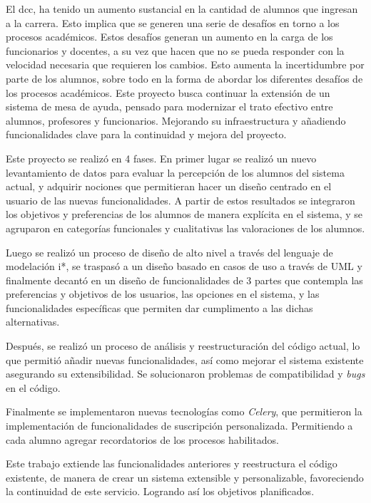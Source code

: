 \begin{resumen}
   \par El \acrfull{dcc}, ha tenido un aumento sustancial en la cantidad de alumnos que ingresan a la carrera. Esto implica que se generen una serie de desafíos en torno a los procesos académicos. Estos desafíos generan un aumento en la carga de los funcionarios y docentes, a su vez que hacen que no se pueda responder con la velocidad necesaria que requieren los cambios. Esto aumenta la incertidumbre por parte de los alumnos, sobre todo en la forma de abordar los diferentes desafíos de los procesos académicos. Este proyecto busca continuar la extensión de un sistema de mesa de ayuda, pensado para modernizar el trato efectivo entre alumnos, profesores y funcionarios. Mejorando su infraestructura y añadiendo funcionalidades clave para la continuidad y mejora del proyecto.

   \par Este proyecto se realizó en 4 fases. En primer lugar se realizó un nuevo levantamiento de datos para evaluar la percepción de los alumnos del sistema actual, y adquirir nociones que permitieran hacer un diseño centrado en el usuario de las nuevas funcionalidades. A partir de estos resultados se integraron los objetivos y preferencias de los alumnos de manera explícita en el sistema, y se agruparon en categorías funcionales y cualitativas las valoraciones de los alumnos.

   \par Luego se realizó un proceso de diseño de alto nivel a través del lenguaje de modelación \gls{i*}, se traspasó a un diseño basado en casos de uso a través de UML y finalmente decantó en un diseño de funcionalidades de 3 partes que contempla las preferencias y objetivos de los usuarios, las opciones en el sistema, y las funcionalidades específicas que permiten dar cumplimento a las dichas alternativas.

   \par Después, se realizó un proceso de análisis y reestructuración del código actual, lo que permitió añadir nuevas funcionalidades, así como mejorar el sistema existente asegurando su extensibilidad. Se solucionaron problemas de compatibilidad y \textit{bugs} en el código.

   \par Finalmente se implementaron nuevas tecnologías como \textit{Celery}, que permitieron la implementación de funcionalidades de suscripción personalizada. Permitiendo a cada alumno agregar recordatorios de los procesos habilitados.

   \par Este trabajo extiende las funcionalidades anteriores y reestructura el código existente, de manera de crear un sistema extensible y personalizable, favoreciendo la continuidad de este servicio. Logrando así los objetivos planificados.
   
\end{resumen}